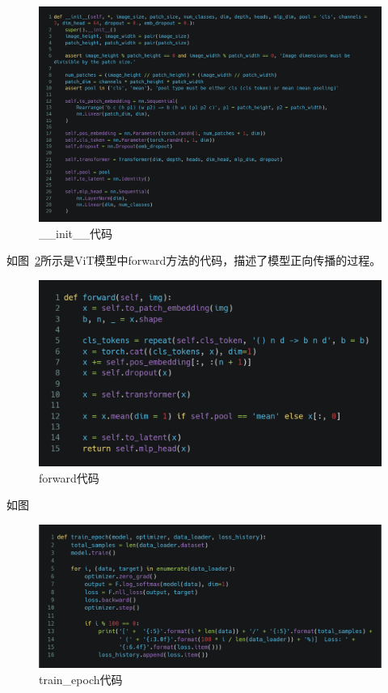\documentclass[UTF8]{ctexrep}
\begin{document}
\begin{figure}[htbp]
    \centering
    \includegraphics[width=0.9\linewidth]{init.png}
    \caption{\_\_init\_\_代码}
    \label{fig:init}
\end{figure}

如图~\ref{fig:forward}所示是ViT模型中forward方法的代码，描述了模型正向传播的过程。

\begin{figure}[htbp]
    \centering
    \includegraphics[width=0.9\linewidth]{forward.png}
    \caption{forward代码}
    \label{fig:forward}
\end{figure}

如图

\begin{figure}[htbp]
    \centering
    \includegraphics[width=0.9\linewidth]{train-epoch.png}
    \caption{train\_epoch代码}
    \label{fig:train-epoch}
\end{figure}



\end{document}
